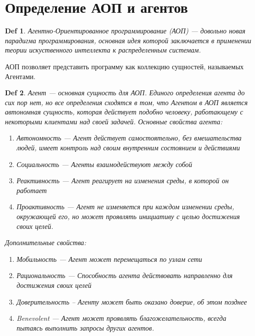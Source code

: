 \documentclass[12pt]{report}
\newtheorem*{maindef}{Def}
\begin{document}
    \section {Определение АОП и агентов}    
        \begin{maindef}
            Агентно-Ориентированное программирование (АОП) --- довольно новая парадигма программирования, основная идея которой заключается в применении теории искуственного интеллекта к распределенным системам.
        \end{maindef}
        АОП позволяет представить программу как коллекцию сущностей, называемых Агентами.
        \begin{maindef}
            Агент --- основная сущность для АОП. Единого определения агента до сих пор нет, но все определения сходятся в том, что Агентом в АОП является автономная сущность, которая действует подобно человеку, работающему с некоторыми клиентами над своей задачей. Основные свойства агента:
            \begin{enumerate}
                \item Автономность --- Агент действует самостоятельно, без вмешательства людей, имеет контроль над своим внутренним состоянием и действиями
                \item Социальность --- Агенты взаимодействуют между собой
                \item Реактивность --- Агент реагирует на изменения среды, в которой он работает
                \item Проактивность --- Агент не изменяется при каждом изменении среды, окружающей его, но может проявлять инициативу с целью достижения своих целей.
            \end{enumerate}
            
            Дополнительные свойства:
            \begin{enumerate}
                \item Мобильность --- Агент может перемещаться по узлам сети
                \item Рациональность --- Способность агента действовать направленно для достижения своих целей
                \item Доверительность -- Агенту может быть оказано доверие, об этом позднее
                \item Benevolent --- Агент может проявлять благожелательность, всегда пытаясь выполнить запросы других агентов.
            \end{enumerate}
        \end{maindef}
        
\end{document}
